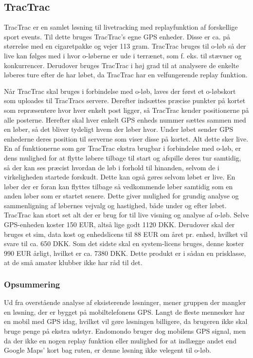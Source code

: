 \subsection{TracTrac}
TracTrac er en samlet løsning til livetracking med replayfunktion af forskellige sport events. Til dette bruges TracTrac's egne GPS enheder. Disse er ca. på størrelse med en cigaretpakke og vejer 113 gram.\newline
TracTrac bruges til o-løb så der live kan følges med i hvor o-løberne er ude i terrænet, som f. eks. til stævner og konkurrencer. Derudover bruges TracTrac i høj grad til at analysere de enkelte løberes ture efter de har løbet, da TracTrac har en velfungerende replay funktion. 

Når TracTrac skal bruges i forbindelse med o-løb, laves der først et o-løbskort som uploades til TracTracs servere. Derefter indsættes præcise punkter på kortet som repræsentere hvor hver enkelt post ligger, så TracTrac kender positionerne på alle posterne. Herefter skal hver enkelt GPS enheds nummer sættes sammen med en løber, så det bliver tydeligt hvem der løber hvor. Under løbet sender GPS enhederne deres position til serverne som viser disse på kortet. Alt dette sker live. En af funktionerne som gør TracTrac ekstra brugbar i forbindelse med o-løb, er dens mulighed for at flytte løbere tilbage til start og afspille deres tur samtidig, så der kan ses præcist hvordan de løb i forhold til hinanden, selvom de i virkeligheden startede forskudt. Dette kan også gøres selvom løbet er live. En løber der er foran kan flyttes tilbage så vedkommende løber samtidig som en anden løber som er startet senere. Dette giver mulighed for grundig analyse og sammenligning af løbernes vejvalg og hastighed, både under og efter løbet.\newline
TracTrac kan stort set alt der er brug for til live visning og analyse af o-løb. Selve GPS-enheden koster 150 EUR, altså lige godt 1120 DKK. Derudover skal der bruges et sim, data kost og enhedslicens til 88 EUR om året pr. enhed, hvilket vil svare til ca. 650 DKK. Som det sidste skal en system-licens bruges, denne koster 990 EUR årligt, hvilket er ca. 7380 DKK. Dette produkt er i sådan en prisklasse, at de små amatør klubber ikke har råd til det. \citep{TTC}


\subsubsection{Opsummering}
Ud fra overstående analyse af eksisterende løsninger, mener gruppen der mangler en løsning, der er bygget på mobiltelefonens GPS. Langt de fleste mennesker har en mobil med GPS idag, hvilket vil gøre løsningen billigere, da brugeren ikke skal bruge penge på ekstra udstyr. Endomondo bruger dog mobilens GPS signal, men da der ikke en nogen replay funktion eller mulighed for at indlægge andet end Google Maps' kort bag ruten, er denne løsning ikke velegent til o-løb. 
